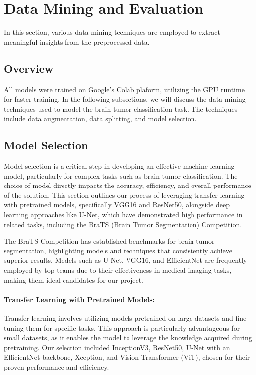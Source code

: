 \section{Data Mining and Evaluation}\label{data_mining}

In this section, various data mining techniques are employed to extract meaningful insights from the preprocessed data.

\subsection{Overview}\label{overview}

All models were trained on Google's Colab plaform, utilizing the GPU runtime for faster training. In the following subsections, we will discuss the data mining techniques used to model the brain tumor classification task. The techniques include data augmentation, data splitting, and model selection.

\subsection{Model Selection}\label{model_selection}

Model selection is a critical step in developing an effective machine learning model, particularly for complex tasks such as brain tumor classification. The choice of model directly impacts the accuracy, efficiency, and overall performance of the solution. This section outlines our process of leveraging transfer learning with pretrained models, specifically VGG16 and ResNet50, alongside deep learning approaches like U-Net, which have demonstrated high performance in related tasks, including the BraTS (Brain Tumor Segmentation) Competition.

The BraTS Competition has established benchmarks for brain tumor segmentation, highlighting models and techniques that consistently achieve superior results. Models such as U-Net, VGG16, and EfficientNet are frequently employed by top teams due to their effectiveness in medical imaging tasks, making them ideal candidates for our project.

\paragraph{Transfer Learning with Pretrained Models:}
Transfer learning involves utilizing models pretrained on large datasets and fine-tuning them for specific tasks. This approach is particularly advantageous for small datasets, as it enables the model to leverage the knowledge acquired during pretraining. Our selection included InceptionV3, ResNet50, U-Net with an EfficientNet backbone, Xception, and Vision Transformer (ViT), chosen for their proven performance and efficiency.

